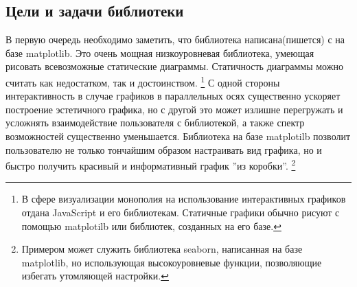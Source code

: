 \documentclass[12pt,fleqn]{article}
\begin{document}
\subsection{Цели и задачи библиотеки}
В первую очередь необходимо заметить, что библиотека написана(пишется) с на базе 
matplotlib. Это очень мощная низкоуровневая библиотека, умеющая рисовать всевозможные 
статические диаграммы. Статичность диаграммы можно считать как недостатком, так и достоинством.
\footnote{В сфере визуализации монополия на использование интерактивных графиков отдана JavaScript и
его библиотекам. Статичные графики обычно рисуют с помощью matplotilb или библиотек, созданных на его базе.} 
С одной стороны интерактивность в случае графиков в параллельных осях существенно ускоряет построение
эстетичного графика, но с другой это может излишне перегружать и усложнять взаимодействие
пользователя с библиотекой, а также спектр возможностей существенно уменьшается. Библиотека на базе 
matplotilb позволит пользователю не только тончайшим образом настраивать вид графика, но и быстро
получить красивый и информативный график ''из коробки''.
\footnote{Примером может служить библиотека seaborn, написанная на базе matplotlib, но
использующая высокоуровневые функции, позволяющие избегать утомляющей настройки.}
\end{document}
